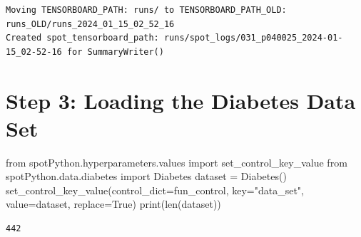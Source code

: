 \documentclass[
  letterpaper,
  DIV=11,
  numbers=noendperiod]{scrreprt}
\newenvironment{Shaded}{\begin{snugshade}}{\end{snugshade}}
\newcommand{\BuiltInTok}[1]{\textcolor[rgb]{0.00,0.23,0.31}{#1}}
\newcommand{\ImportTok}[1]{\textcolor[rgb]{0.00,0.46,0.62}{#1}}
\newcommand{\NormalTok}[1]{\textcolor[rgb]{0.00,0.23,0.31}{#1}}
\newcommand{\OperatorTok}[1]{\textcolor[rgb]{0.37,0.37,0.37}{#1}}
\newcommand{\StringTok}[1]{\textcolor[rgb]{0.13,0.47,0.30}{#1}}
\newcommand{\VariableTok}[1]{\textcolor[rgb]{0.07,0.07,0.07}{#1}}
\begin{document}
\begin{verbatim}
Moving TENSORBOARD_PATH: runs/ to TENSORBOARD_PATH_OLD: runs_OLD/runs_2024_01_15_02_52_16
Created spot_tensorboard_path: runs/spot_logs/031_p040025_2024-01-15_02-52-16 for SummaryWriter()
\end{verbatim}

\section{Step 3: Loading the Diabetes Data
Set}\label{step-3-loading-the-diabetes-data-set}

\begin{Shaded}
\begin{Highlighting}[]
\ImportTok{from}\NormalTok{ spotPython.hyperparameters.values }\ImportTok{import}\NormalTok{ set\_control\_key\_value}
\ImportTok{from}\NormalTok{ spotPython.data.diabetes }\ImportTok{import}\NormalTok{ Diabetes}
\NormalTok{dataset }\OperatorTok{=}\NormalTok{ Diabetes()}
\NormalTok{set\_control\_key\_value(control\_dict}\OperatorTok{=}\NormalTok{fun\_control,}
\NormalTok{                        key}\OperatorTok{=}\StringTok{"data\_set"}\NormalTok{,}
\NormalTok{                        value}\OperatorTok{=}\NormalTok{dataset,}
\NormalTok{                        replace}\OperatorTok{=}\VariableTok{True}\NormalTok{)}
\BuiltInTok{print}\NormalTok{(}\BuiltInTok{len}\NormalTok{(dataset))}
\end{Highlighting}
\end{Shaded}

\begin{verbatim}
442
\end{verbatim}
\end{document}
